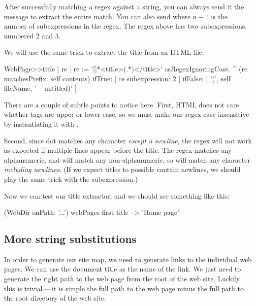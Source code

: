 \documentclass[a4paper,10pt,twoside]{book}
\begin{document}
After successfully matching a regex against a string, you can always send it the message  to extract the entire match.  You can also send  where $n-1$ is the number of subexpressions in the regex. The regex above has two subexpressions, numbered $2$ and $3$.

We will use the same trick to extract the title from an HTML file.


\begin{code}{}
WebPage>>title
	| re |
	re := '[\w\W]*<title>(.*)</title>' asRegexIgnoringCase.
	^ (re matchesPrefix: self contents)
		ifTrue: [ re subexpression: 2 ]
		ifFalse: [ '(', self fileName, ' -- untitled)' ]
\end{code}

There are a couple of subtle points to notice here.
First, HTML does not care whether tags are upper or lower case, so we must make our regex case insensitive by instantiating it with .

Second, since dot matches any character \emph{except a newline}, the regex \mbox{} will not work as expected if multiple lines appear before the title.
The regex \ct{\w} matches any alphanumeric, and \ct{\W} will match any non-alphanumeric, so \ct{[\\w\\W]} will match any character \emph{including newlines}.
(If we expect titles to possible contain newlines, we should play the same trick with the subexpression.)

Now we can test our title extractor, and we should see something like this:

\begin{code}{}
(WebDir onPath: '...') webPages first title --> 'Home page'
\end{code}

\subsection{More string substitutions}

In order to generate our site map, we need to generate links to the individual web pages.
We can use the document title as the name of the link.  We just need to generate the right path to the web page from the root of the web site.
Luckily this is trivial\,---\,it is simple the full path to the web page minus the full path to the root directory of the web site.
\end{document}
